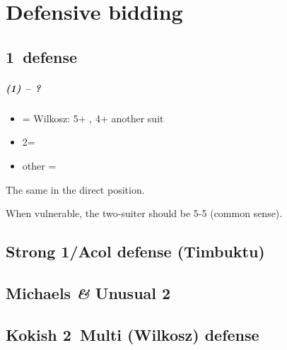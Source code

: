 \documentclass[12pt, a4paper]{report}
\begin{document}
\part*{\colorbox{RoyalPurple!30}{Defensive bidding}}
 {

    \chapter*{\colorbox{Plum!30}{1\ntx\ defense}}
     {

        \subsubsection*{(1\ntx) -- ?}
        \begin{itemize}
            \item \dbl = Wilkosz: 5+ \major, 4+ another suit
            \item 2\clubs = \minor
            \item other = \nat
        \end{itemize}

        The same in the direct position.

        When vulnerable, the two-suiter should be 5-5 (common sense).

    }

    \chapter*{\colorbox{Plum!30}{Strong 1\clubs\//Acol defense (Timbuktu)}}
     {

    }

    \chapter*{\colorbox{Plum!30}{Michaels \textit{\&} Unusual 2\ntx}}
     {
    }

    \chapter*{\colorbox{Plum!30}{Kokish 2\diams\ Multi (Wilkosz) defense}}
     {

    }
}
\end{document}
